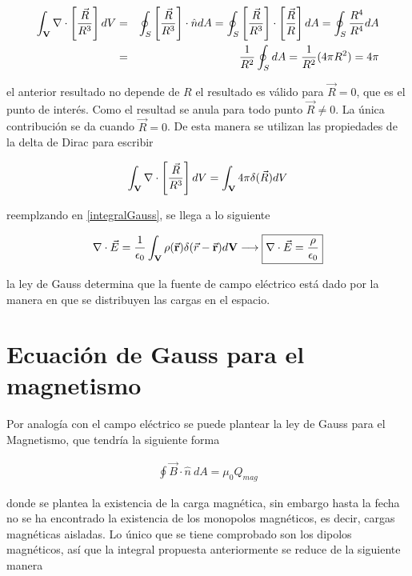 \begin{eqnarray}
    \int_{\bf{V}}\nabla\cdot\left[\frac{\vec{R}}{R^{3}}\right]dV &=& \oint_{S}\left[\frac{\vec{R}}{R^{3}}\right]\cdot\hat{n}dA = \oint_{S}\left[\frac{\vec{R}}{R^{3}}\right]\cdot\left[\frac{\vec{R}}{R}\right]dA = \oint_{S}\frac{R^{4}}{R^{4}}dA \\
    &=&\frac{1}{R^{2}}\oint_{S}dA = \frac{1}{R^{2}}(4\pi R^{2}) = 4\pi
\end{eqnarray}

\noindent el anterior resultado no depende de $R$ el resultado es válido para $\vec{R} = 0$, que es el punto de interés. Como el resultad se anula para todo punto $\vec{R} \neq 0$. La única contribución se da cuando $\vec{R} = 0$. De esta manera se utilizan las propiedades de la delta de Dirac \cite{Arfken} para escribir 

\begin{eqnarray}
    \int_{\bf{V}}\nabla\cdot\left[\frac{\vec{R}}{R^{3}}\right]dV = \int_{\bf{V}}4\pi \delta(\vec{R})dV
\end{eqnarray}

\noindent reemplzando en \eqref{integralGauss}, se llega a lo siguiente

\begin{eqnarray}
    \label{Leygauss}
    \nabla \cdot \vec{E} = \frac{1}{\epsilon_{0}}\int_{\bf{V}}\rho(\vec{\bf{r}})\delta(\vec{r}-\vec{\bf{r}})d\bf{V} \longrightarrow \boxed{ \nabla \cdot \vec{E} = \frac{\rho}{\epsilon_{0}}}
\end{eqnarray}

\noindent la ley de Gauss determina que la fuente de campo eléctrico está dado por la manera en que se distribuyen las cargas en el espacio.


\section{Ecuación de Gauss para el magnetismo }


\noindent Por analogía con el campo eléctrico se puede plantear la ley de Gauss para el Magnetismo, que tendría la siguiente forma

\begin{eqnarray}
    \oint \vec{B}\cdot\hat{n}\  dA = \mu_{0}Q_{mag}
\end{eqnarray}

\noindent donde se plantea la existencia de la carga magnética, sin embargo hasta la fecha no se ha encontrado la existencia de los monopolos magnéticos, es decir, cargas magnéticas aisladas. Lo único que se tiene comprobado son los dipolos magnéticos, así que la integral propuesta anteriormente se reduce de la siguiente manera

